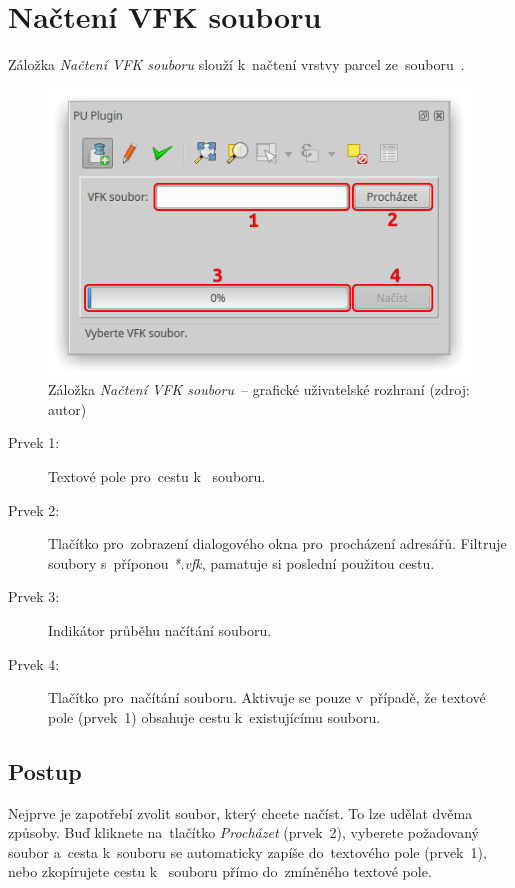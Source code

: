 \newpage

\section{Načtení VFK souboru}
\label{manual_nacteni_vfk}

Záložka \textit{Načtení VFK souboru} slouží k~načtení vrstvy parcel
ze~souboru~.

	\begin{figure}[H] \centering
		\includegraphics[width=.55\textwidth]{./pictures/nacteni_vfk_gui.png}
		\caption[Záložka \textit{Načtení VFK souboru}~–
grafické uživatelské rozhraní]{Záložka \textit{Načtení VFK souboru}~–
grafické uživatelské rozhraní (zdroj: autor)}
		\label{fig:manual_nacteni_vfk_gui}
 	\end{figure}

\begin{description}
	\item[Prvek 1:] Textové pole pro~cestu k~ souboru.
	\item[Prvek 2:] Tlačítko pro~zobrazení dialogového okna
pro~procházení adresářů. Filtruje soubory s~příponou \textit{*.vfk},
pamatuje si poslední použitou cestu.
	\item[Prvek 3:] Indikátor průběhu načítání  souboru.
	\item[Prvek 4:] Tlačítko pro~načítání 
souboru. Aktivuje se pouze v~případě, že textové pole (prvek~1)
obsahuje cestu k~existujícímu  souboru.
\end{description}

\subsection{Postup}
\label{manual_nacteni_postup}

Nejprve je zapotřebí zvolit  soubor, který chcete načíst. To
lze udělat dvěma způsoby. Buď kliknete na~tlačítko \textit{Procházet}
(prvek~2), vyberete požadovaný soubor a~cesta k~souboru se automaticky
zapíše do~textového pole (prvek~1), nebo zkopírujete cestu k~
souboru přímo do~zmíněného textové pole.

